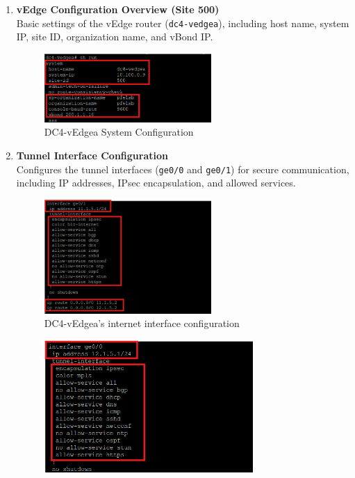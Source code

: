 \documentclass[12pt,english]{report}
\begin{document}
\begin{enumerate}
    \item \textbf{vEdge Configuration Overview (Site 500)} \\
    Basic settings of the vEdge router (\texttt{dc4-vedgea}), including host name, system IP, site ID, organization name, and vBond IP.
\begin{figure}[H]
    \centering
    \includegraphics[width= 0.6\textwidth]{chapitre 3/4vedgea1.png}
    \caption{DC4-vEdgea System Configuration}
    \label{fig: Credentials Extraction}
\end{figure} 
    \item \textbf{Tunnel Interface Configuration} \\
    Configures the tunnel interfaces (\texttt{ge0/0} and \texttt{ge0/1}) for secure communication, including IP addresses, IPsec encapsulation, and allowed services.
\begin{figure}[H]
    \centering
    \includegraphics[width= 0.6\textwidth]{chapitre 3/4vedgea4.png}
    \caption{DC4-vEdgea's internet interface configuration}
    \label{fig: DC4 internet interface configuration}
\end{figure}
\begin{figure}[H]
    \centering
    \includegraphics[width= 0.75\textwidth]{chapitre 3/4vedgea3.png}

\end{figure}
\end{enumerate}
\end{document}
